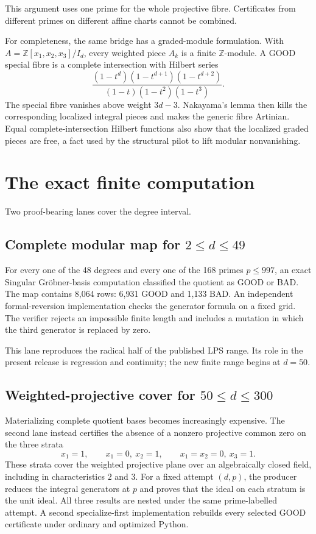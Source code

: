 \documentclass[11pt]{article}
\theoremstyle{definition}
\newcommand{\ZZ}{\mathbb{Z}}
\begin{document}
This argument uses one prime for the whole projective fibre.  Certificates
from different primes on different affine charts cannot be combined.

For completeness, the same bridge has a graded-module formulation.  With
$A=\ZZ[x_1,x_2,x_3]/I_d$, every weighted piece $A_k$ is a finite
$\ZZ$-module.  A GOOD special fibre is a complete intersection with Hilbert
series
\[
 \frac{(1-t^d)(1-t^{d+1})(1-t^{d+2})}
 {(1-t)(1-t^2)(1-t^3)}.
\]
The special fibre vanishes above weight $3d-3$.  Nakayama's lemma then kills
the corresponding localized integral pieces and makes the generic fibre
Artinian.  Equal complete-intersection Hilbert functions also show that the
localized graded pieces are free, a fact used by the structural pilot to lift
modular nonvanishing.

\section{The exact finite computation}

Two proof-bearing lanes cover the degree interval.

\subsection{Complete modular map for $2\le d\le49$}

For every one of the 48 degrees and every one of the 168 primes $p\le997$,
an exact Singular Gr\"obner-basis computation classified the quotient as
GOOD or BAD.  The map contains 8,064 rows: 6,931 GOOD and 1,133 BAD.  An
independent formal-reversion implementation checks the generator formula on
a fixed grid.  The verifier rejects an impossible finite length and includes
a mutation in which the third generator is replaced by zero.

This lane reproduces the radical half of the published LPS range.  Its role in
the present release is regression and continuity; the new finite range begins
at $d=50$.

\subsection{Weighted-projective cover for $50\le d\le300$}

Materializing complete quotient bases becomes increasingly expensive.  The
second lane instead certifies the absence of a nonzero projective common zero
on the three strata
\begin{equation}\label{eq:charts}
 x_1=1,\qquad x_1=0,\ x_2=1,\qquad
 x_1=x_2=0,\ x_3=1.
\end{equation}
These strata cover the weighted projective plane over an algebraically closed
field, including in characteristics $2$ and $3$.  For a fixed attempt $(d,p)$,
the producer reduces the integral generators at $p$ and proves that the ideal
on each stratum is the unit ideal.  All three results are nested under the
same prime-labelled attempt.  A second specialize-first implementation
rebuilds every selected GOOD certificate under ordinary and optimized Python.
\end{document}
